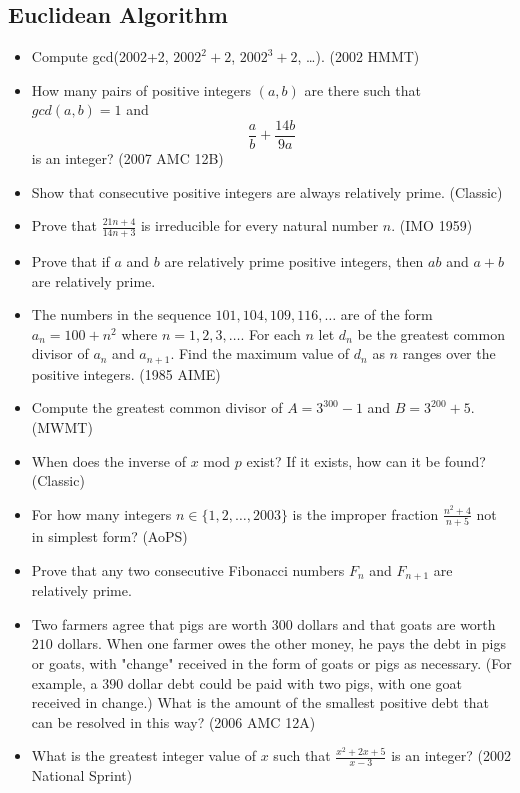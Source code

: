 \documentclass{article}
\begin{document}
\subsection{Euclidean Algorithm}

\begin{itemize}

\item Compute gcd(2002+2, $2002^2+2$, $2002^3+2$, \ldots ). (2002 HMMT)

\item How many pairs of positive integers $(a,b)$ are there such that $gcd(a,b)=1$ and $$\frac{a}{b}+\frac{14b}{9a}$$ is an integer? (2007 AMC 12B)

\item Show that consecutive positive integers are always relatively prime. (Classic)

\item Prove that $\frac{21n+4}{14n+3}$ is irreducible for every natural number $n$. (IMO 1959)

\item Prove that if $a$ and $b$ are relatively prime positive integers, then $ab$ and $a+b$ are relatively prime.

\item The numbers in the sequence $101, 104, 109, 116, \ldots $ are of the form $a_n=100+n^2$ where $n=1, 2, 3, \ldots$. For each $n$ let $d_n$ be the greatest common divisor of $a_n$ and $a_{n+1}$. Find the maximum value of $d_n$ as $n$ ranges over the positive integers. (1985 AIME)

\item Compute the greatest common divisor of $A=3^{300}-1$ and $B=3^{200}+5$. (MWMT)


\item When does the inverse of $x$ mod $p$ exist? If it exists, how can it be found? (Classic)

\item For how many integers $n\in\{ 1, 2, \ldots, 2003\}$ is the improper fraction $\frac{n^2+4}{n+5}$ not in simplest form? (AoPS)


\item Prove that any two consecutive Fibonacci numbers $F_n$ and $F_{n+1}$ are relatively prime.

\item Two farmers agree that pigs are worth $300$ dollars and that goats are worth $210$ dollars. When one farmer owes the other money, he pays the debt in pigs or goats, with "change" received in the form of goats or pigs as necessary. (For example, a $390$ dollar debt could be paid with two pigs, with one goat received in change.) What is the amount of the smallest positive debt that can be resolved in this way? (2006 AMC 12A)

\item What is the greatest integer value of $x$ such that $\frac{x^2+2x+5}{x-3}$ is an integer? (2002 National Sprint)

\end{itemize}
\end{document}
